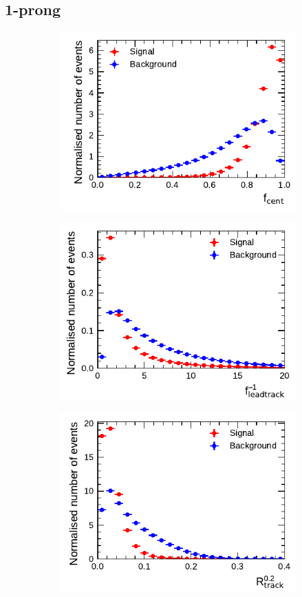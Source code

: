 \subsection{1-prong}
\begin{figure}[!ht]
  \begin{subfigure}{0.5\textwidth}
    \centering
    \includegraphics{./figures/baseline_bdt_vars/1p/centFrac.pdf}
  \end{subfigure}%
  \begin{subfigure}{0.5\textwidth}
    \centering
    \includegraphics{./figures/baseline_bdt_vars/1p/etOverPtLeadTrk.pdf}
  \end{subfigure}
  \begin{subfigure}{0.5\textwidth}
    \centering
    \includegraphics{./figures/baseline_bdt_vars/1p/innerTrkAvgDist.pdf}

\end{subfigure}
\end{figure}
